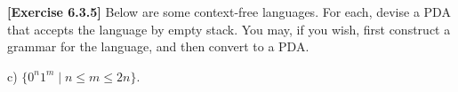 \textbf{[Exercise 6.3.5]} Below are some context-free languages.
For each, devise a PDA that accepts the language by empty stack.
You may, if you wish, first construct a grammar for the language,
and then convert to a PDA.

c) $\{0^n1^m\mid n\le m \le 2n\}$.